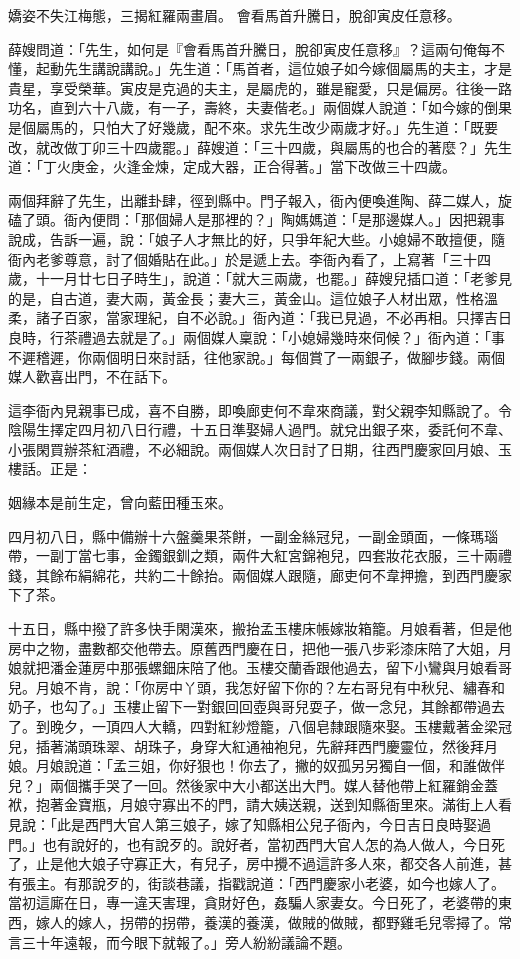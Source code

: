 嬌姿不失江梅態，三揭紅羅兩畫眉。
會看馬首升騰日，脫卻寅皮任意移。

薛嫂問道：「先生，如何是『會看馬首升騰日，脫卻寅皮任意移』？這兩句俺每不懂，起動先生講說講說。」先生道：「馬首者，這位娘子如今嫁個屬馬的夫主，才是貴星，享受榮華。寅皮是克過的夫主，是屬虎的，雖是寵愛，只是偏房。往後一路功名，直到六十八歲，有一子，壽終，夫妻偕老。」兩個媒人說道：「如今嫁的倒果是個屬馬的，只怕大了好幾歲，配不來。求先生改少兩歲才好。」先生道：「既要改，就改做丁卯三十四歲罷。」薛嫂道：「三十四歲，與屬馬的也合的著麼？」先生道：「丁火庚金，火逢金煉，定成大器，正合得著。」當下改做三十四歲。

兩個拜辭了先生，出離卦肆，徑到縣中。門子報入，衙內便喚進陶、薛二媒人，旋磕了頭。衙內便問：「那個婦人是那裡的？」陶媽媽道：「是那邊媒人。」因把親事說成，告訴一遍，說：「娘子人才無比的好，只爭年紀大些。小媳婦不敢擅便，隨衙內老爹尊意，討了個婚貼在此。」於是遞上去。李衙內看了，上寫著「三十四歲，十一月廿七日子時生」，說道：「就大三兩歲，也罷。」薛嫂兒插口道：「老爹見的是，自古道，妻大兩，黃金長；妻大三，黃金山。這位娘子人材出眾，性格溫柔，諸子百家，當家理紀，自不必說。」衙內道：「我已見過，不必再相。只擇吉日良時，行茶禮過去就是了。」兩個媒人稟說：「小媳婦幾時來伺候？」衙內道：「事不遲稽遲，你兩個明日來討話，往他家說。」每個賞了一兩銀子，做腳步錢。兩個媒人歡喜出門，不在話下。

這李衙內見親事已成，喜不自勝，即喚廊吏何不韋來商議，對父親李知縣說了。令陰陽生擇定四月初八日行禮，十五日準娶婦人過門。就兌出銀子來，委託何不韋、小張閑買辦茶紅酒禮，不必細說。兩個媒人次日討了日期，往西門慶家回月娘、玉樓話。正是：

姻緣本是前生定，曾向藍田種玉來。

四月初八日，縣中備辦十六盤羹果茶餅，一副金絲冠兒，一副金頭面，一條瑪瑙帶，一副丁當七事，金鐲銀釧之類，兩件大紅宮錦袍兒，四套妝花衣服，三十兩禮錢，其餘布絹綿花，共約二十餘抬。兩個媒人跟隨，廊吏何不韋押擔，到西門慶家下了茶。

十五日，縣中撥了許多快手閑漢來，搬抬孟玉樓床帳嫁妝箱籠。月娘看著，但是他房中之物，盡數都交他帶去。原舊西門慶在日，把他一張八步彩漆床陪了大姐，月娘就把潘金蓮房中那張螺鈿床陪了他。玉樓交蘭香跟他過去，留下小鸞與月娘看哥兒。月娘不肯，說：「你房中丫頭，我怎好留下你的？左右哥兒有中秋兒、繡春和奶子，也勾了。」玉樓止留下一對銀回回壺與哥兒耍子，做一念兒，其餘都帶過去了。到晚夕，一頂四人大轎，四對紅紗燈籠，八個皂隸跟隨來娶。玉樓戴著金梁冠兒，插著滿頭珠翠、胡珠子，身穿大紅通袖袍兒，先辭拜西門慶靈位，然後拜月娘。月娘說道：「孟三姐，你好狠也！你去了，撇的奴孤另另獨自一個，和誰做伴兒？」兩個攜手哭了一回。然後家中大小都送出大門。媒人替他帶上紅羅銷金蓋袱，抱著金寶瓶，月娘守寡出不的門，請大姨送親，送到知縣衙里來。滿街上人看見說：「此是西門大官人第三娘子，嫁了知縣相公兒子衙內，今日吉日良時娶過門。」也有說好的，也有說歹的。說好者，當初西門大官人怎的為人做人，今日死了，止是他大娘子守寡正大，有兒子，房中攪不過這許多人來，都交各人前進，甚有張主。有那說歹的，街談巷議，指戳說道：「西門慶家小老婆，如今也嫁人了。當初這廝在日，專一違天害理，貪財好色，姦騙人家妻女。今日死了，老婆帶的東西，嫁人的嫁人，拐帶的拐帶，養漢的養漢，做賊的做賊，都野雞毛兒零撏了。常言三十年遠報，而今眼下就報了。」旁人紛紛議論不題。

